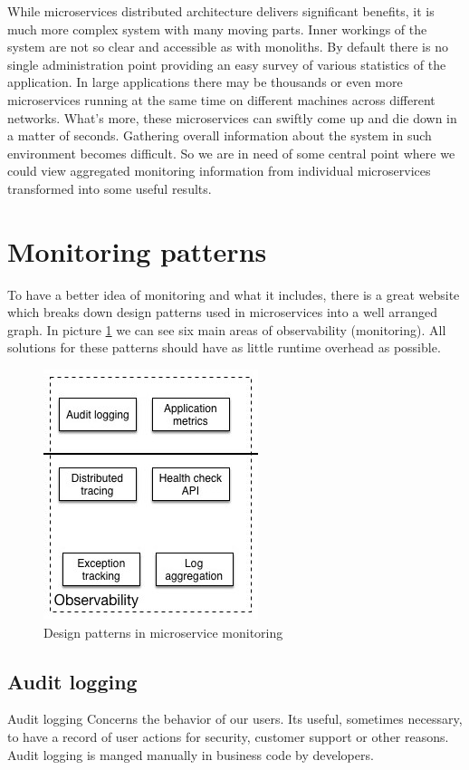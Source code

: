 \documentclass[12pt,oneside]{fithesis2}
\begin{document}
While microservices distributed architecture delivers significant benefits, it is much more complex system with many moving parts. Inner workings of the system are not so clear and accessible as with monoliths. By default there is no single administration point providing an easy survey of various statistics of the application. In large applications there may be thousands or even more microservices running at the same time on different machines across different networks. What's more, these microservices can swiftly come up and die down in a matter of seconds. Gathering overall information about the system in such environment becomes difficult. So we are in need of some central point where we could view aggregated monitoring information from individual microservices transformed into some useful results.

\section{Monitoring patterns}

To have a better idea of monitoring and what it includes, there is a great website\cite{ms_patterns} which breaks down design patterns used in microservices into a well arranged graph. In picture \ref{observability} we can see six main areas of observability (monitoring). All solutions for these patterns should have as little runtime overhead as possible.

\begin{figure}[ht!]
	\label{observability}
	\centering
	\includegraphics{images/observability.jpg}
	\caption{Design patterns in microservice monitoring\cite{ms_patterns}}
\end{figure}

\subsection{Audit logging}
Audit logging Concerns the behavior of our users. Its useful, sometimes necessary, to have a record of user actions for security, customer support or other reasons. Audit logging is manged manually in business code by developers.
\end{document}

